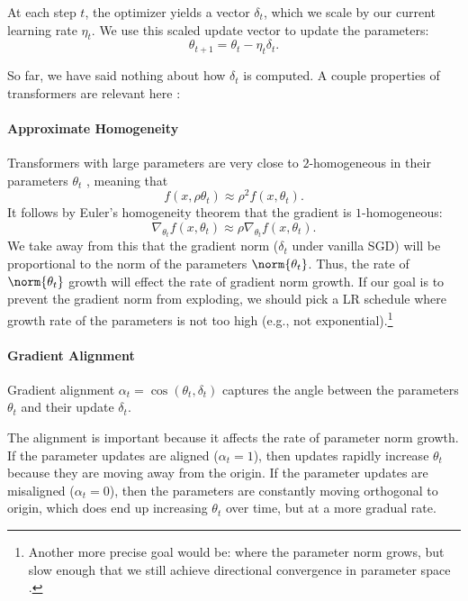 At each step $t$, the optimizer yields a vector $\delta_t$, which we scale by our current learning rate $\eta_t$. We use this scaled update vector to update the parameters:
\begin{equation*}
    \theta_{t+1} = \theta_t - \eta_t \delta_t .
\end{equation*}

So far, we have said nothing about how $\delta_t$ is computed. A couple properties of transformers are relevant here \citep{merrill2021effects}:

\paragraph{Approximate Homogeneity}
Transformers with large parameters are very close to $2$-homogeneous in their parameters $\theta_t$ \citep{merrill2021effects}, meaning that
\begin{equation*}
    f(x, \rho \theta_t) \approx \rho^2 f(x, \theta_t) .
\end{equation*}
It follows by Euler's homogeneity theorem that the gradient is $1$-homogeneous:
\begin{equation*}
    \nabla_{\theta_t} f(x, \theta_t) \approx \rho \nabla_{\theta_t} f(x, \theta_t) .
\end{equation*}
We take away from this that the gradient norm ($\delta_t$ under vanilla SGD) will be proportional to the norm of the parameters $\norm{\theta_t}$. Thus, the rate of $\norm{\theta_t}$ growth will effect the rate of gradient norm growth. If our goal is to prevent the gradient norm from exploding, we should pick a LR schedule where growth rate of the parameters is not too high (e.g., not exponential).\footnote{Another more precise goal would be: where the parameter norm grows, but slow enough that we still achieve directional convergence in parameter space \citep{ji2020directional}.}

\paragraph{Gradient Alignment}
Gradient alignment $\alpha_t = \cos(\theta_t, \delta_t)$ captures the angle between the parameters $\theta_t$ and their update $\delta_t$.

The alignment is important because it affects the rate of parameter norm growth. If the parameter updates are aligned ($\alpha_t = 1$), then updates rapidly increase $\theta_t$ because they are moving away from the origin. If the parameter updates are misaligned ($\alpha_t = 0$), then the parameters are constantly moving orthogonal to origin, which does end up increasing $\theta_t$ over time, but at a more gradual rate.

